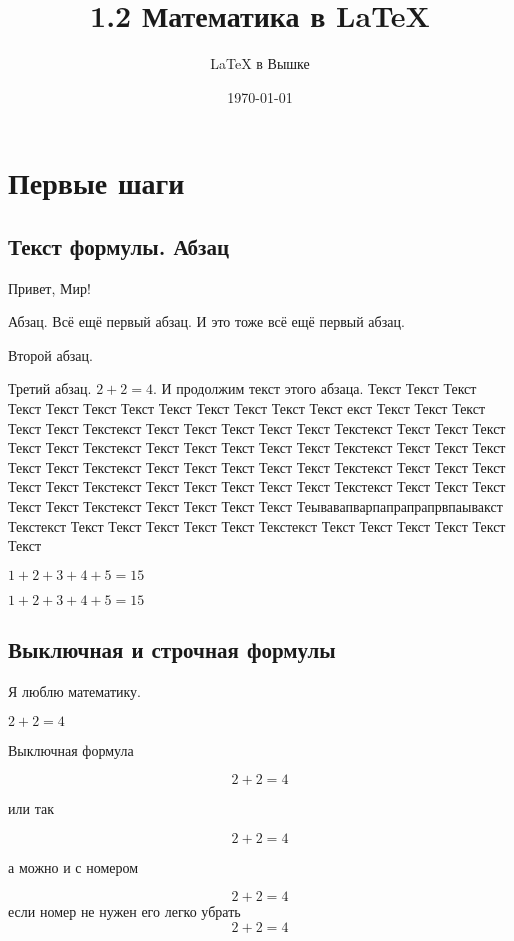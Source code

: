 \documentclass[a4paper,12pt]{article} %
\author{\LaTeX{} в Вышке}
\title{1.2 Математика в \LaTeX}
\date{\today}
\begin{document}

\maketitle %


\section{Первые шаги}
\subsection{Текст формулы. Абзац}

Привет,                                          Мир!

Абзац.
Всё ещё первый абзац.
И это тоже всё ещё первый абзац.
				
Второй абзац.







Третий абзац. 
$ 2 + 2 = 4 $. 
И продолжим текст этого абзаца. Текст Текст Текст Текст Текст Текст Текст Текст Текст Текст Текст Текст екст Текст Текст Текст Текст Текст Текстекст Текст Текст Текст Текст Текст Текстекст Текст Текст Текст Текст Текст Текстекст Текст Текст Текст Текст Текст Текстекст Текст Текст Текст Текст Текст Текстекст Текст Текст Текст Текст Текст Текстекст Текст Текст Текст Текст Текст Текстекст Текст Текст Текст Текст Текст Текстекст Текст Текст Текст Текст Текст Текстекст Текст Текст Текст Текст Теывавапварпапрапрапрвпаывакст Текстекст Текст Текст Текст Текст Текст Текстекст Текст Текст Текст Текст Текст Текст 

$1+2+3+4+5=15$

$ 1 + 2 + 3 + 4 + 5 = 15 $

\subsection{Выключная  и строчная формулы}

Я люблю математику. 

$ 2 + 2 = 4 $

Выключная формула

\[ 2+2=  4 \]

или так

$$2+2=4$$

а можно и с номером

\begin{equation}\label{eq:firstEquationInMyLife}
	2+2=4
\end{equation}
если номер не нужен его легко убрать
\begin{equation*}
	2+2=4
\end{equation*}
\end{document}
